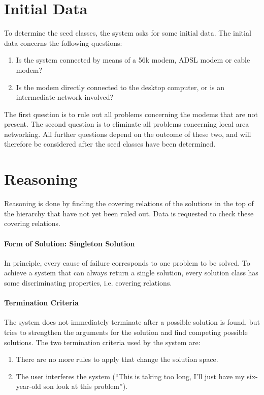 \documentclass[a4paper,11pt]{article}
\begin{document}
\section*{Initial Data}

To determine the seed classes, the system asks for some initial data. The
initial data concerns the following questions:
\begin{enumerate}
\item Is the system connected by means of a 56k modem, ADSL modem or cable
  modem?
\item Is the modem directly connected to the desktop computer, or is an
  intermediate network involved?
\end{enumerate}

The first question is to rule out all problems concerning the modems that are
not present. The second question is to eliminate all problems concerning local
area networking. All further questions depend on the outcome of these two, and
will therefore be considered after the seed classes have been determined.


\section*{Reasoning}

Reasoning is done by finding the covering relations of the solutions in the
top of the hierarchy that have not yet been ruled out. Data is requested to
check these covering relations.

\paragraph{Form of Solution: Singleton Solution}

In principle, every cause of failure corresponds to one problem to be
solved. To achieve a system that can always return a single solution, every
solution class has some discriminating properties, i.e. covering relations.

\paragraph{Termination Criteria}

The system does not immediately terminate after a possible solution is found,
but tries to strengthen the arguments for the solution and find competing
possible solutions. The two termination criteria used by the system are:
\begin{enumerate}
\item There are no more rules to apply that change the solution space.
\item The user interferes the system (``This is taking too long, I'll just
  have my six-year-old son look at this problem'').
\end{enumerate}
\end{document}
